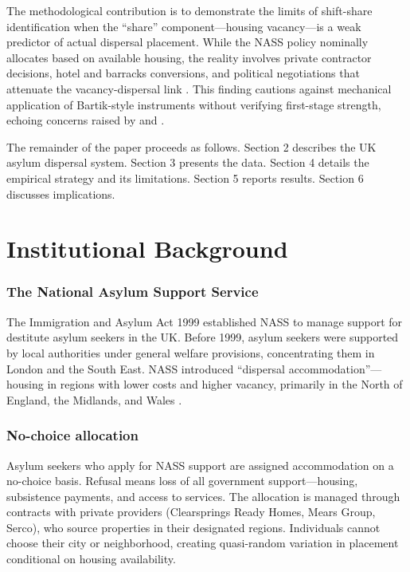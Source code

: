 \documentclass[12pt]{article}
\begin{document}
The methodological contribution is to demonstrate the limits of shift-share identification when the ``share'' component---housing vacancy---is a weak predictor of actual dispersal placement. While the NASS policy nominally allocates based on available housing, the reality involves private contractor decisions, hotel and barracks conversions, and political negotiations that attenuate the vacancy-dispersal link \citep{allen2014welfare}. This finding cautions against mechanical application of Bartik-style instruments without verifying first-stage strength, echoing concerns raised by \citet{jaeger2020shift} and \citet{adao2019shift}.

The remainder of the paper proceeds as follows. Section 2 describes the UK asylum dispersal system. Section 3 presents the data. Section 4 details the empirical strategy and its limitations. Section 5 reports results. Section 6 discusses implications.


\section{Institutional Background}

\subsubsection*{The National Asylum Support Service} The Immigration and Asylum Act 1999 established NASS to manage support for destitute asylum seekers in the UK. Before 1999, asylum seekers were supported by local authorities under general welfare provisions, concentrating them in London and the South East. NASS introduced ``dispersal accommodation''---housing in regions with lower costs and higher vacancy, primarily in the North of England, the Midlands, and Wales \citep{hales2009national}.

\subsubsection*{No-choice allocation} Asylum seekers who apply for NASS support are assigned accommodation on a no-choice basis. Refusal means loss of all government support---housing, subsistence payments, and access to services. The allocation is managed through contracts with private providers (Clearsprings Ready Homes, Mears Group, Serco), who source properties in their designated regions. Individuals cannot choose their city or neighborhood, creating quasi-random variation in placement conditional on housing availability.
\end{document}
